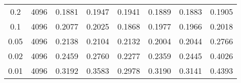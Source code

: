 \begin{table}[h]
\begin{tabular}{c c c c c c c c}
		0.2        & 4096               & 0.1881 & 0.1947 & 0.1941 & 0.1889 & 0.1883 & 0.1905             \\
		0.1        & 4096               & 0.2077 & 0.2025 & 0.1868 & 0.1977 & 0.1966 & 0.2018             \\
		0.05       & 4096               & 0.2138 & 0.2104 & 0.2132 & 0.2004 & 0.2044 & 0.2766             \\
		0.02       & 4096               & 0.2459 & 0.2760 & 0.2277 & 0.2359 & 0.2445 & 0.4026             \\
		0.01       & 4096               & 0.3192 & 0.3583 & 0.2978 & 0.3190 & 0.3141 & 0.4393             \\
		\hline
	\end{tabular}
\end{table}